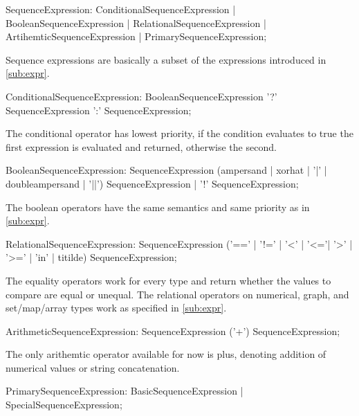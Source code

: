 \begin{rail}
  SequenceExpression:  
    ConditionalSequenceExpression |
    BooleanSequenceExpression |
    RelationalSequenceExpression |
    ArtihemticSequenceExpression |
    PrimarySequenceExpression;
\end{rail}

Sequence expressions are basically a subset of the expressions introduced in \ref{sub:expr}.

\begin{rail}
  ConditionalSequenceExpression: 
    BooleanSequenceExpression '?' SequenceExpression ':' SequenceExpression;
\end{rail}

The conditional operator has lowest priority, if the condition evaluates to true the first expression is evaluated and returned, otherwise the second.

\begin{rail}
  BooleanSequenceExpression: 
    SequenceExpression (ampersand | xorhat | '|' | doubleampersand | '||') SequenceExpression |
    '!' SequenceExpression;
\end{rail}

The boolean operators have the same semantics and same priority as in \ref{sub:expr}.

\begin{rail}
  RelationalSequenceExpression: 
    SequenceExpression ('==' | '!=' | '<' | '<='| '>' | '>=' | 'in' | titilde) SequenceExpression;
\end{rail}

The equality operators work for every type and return whether the values to compare are equal or unequal.
The relational operators on numerical, graph, and set/map/array types work as specified in \ref{sub:expr}.

\begin{rail}
  ArithmeticSequenceExpression:
    SequenceExpression ('+') SequenceExpression;
\end{rail}

The only arithemtic operator available for now is plus, denoting addition of numerical values or string concatenation.

\begin{rail}
  PrimarySequenceExpression:
    BasicSequenceExpression |
    SpecialSequenceExpression;
\end{rail}

